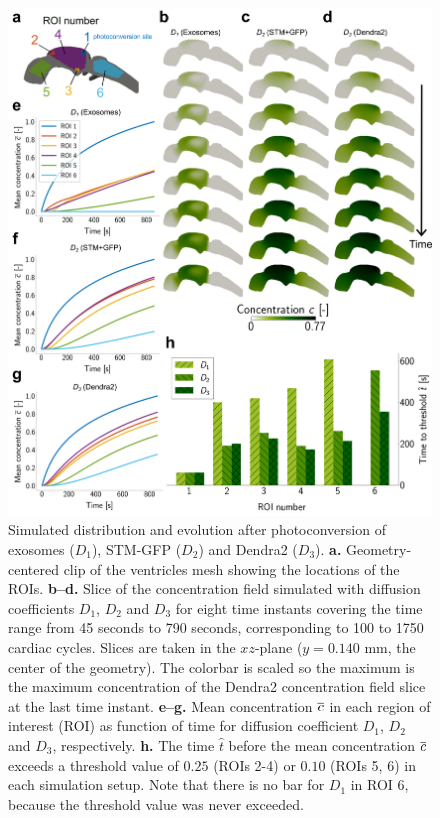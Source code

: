 \documentclass{WileyMSP-template}
\begin{document}
\begin{figure}%
    \centering
    \includegraphics[width=\textwidth]{graphics/figure2_simulation_results_different_coeffs.png}\caption{Simulated distribution and evolution after photoconversion of
    exosomes ($D_1$), STM-GFP ($D_2$) and Dendra2 ($D_3$). 
    \textbf{a.} Geometry-centered clip of the ventricles mesh showing the locations of the ROIs.
    \textbf{b--d.} Slice of the concentration field simulated
    with diffusion coefficients $D_1$, $D_2$ and $D_3$ for eight time instants covering the
    time range from 45 seconds to 790 seconds, corresponding to 100 to 1750 cardiac cycles.
    Slices are taken in the $xz$-plane ($y=0.140$ mm, the center of the geometry).
    The colorbar is scaled so the maximum is the maximum concentration of the Dendra2 
    concentration field slice at the last time instant.
    \textbf{e--g.} Mean concentration $\overline{c}$ in each region of interest (ROI)
    as function of time for diffusion coefficient $D_1$, $D_2$ and $D_3$, respectively. 
    \textbf{h.} The time $\hat{t}$ before the mean concentration $\overline{c}$ exceeds a
    threshold value of $0.25$ (ROIs 2-4) or $0.10$ (ROIs 5, 6) in each simulation setup.
    Note that there is no bar for $D_1$ in ROI 6, because the threshold value was never exceeded.}\label{fig:fig2}
\end{figure}
\end{document}
